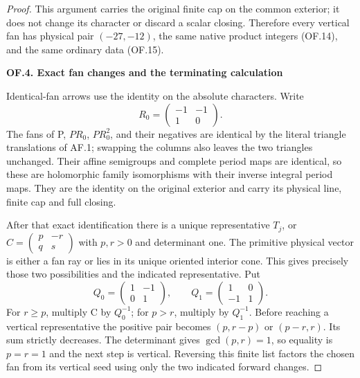 \begin{proof}
This argument carries the original finite cap on the
common exterior; it does not change its character or
discard a scalar closing. Therefore every vertical fan
has physical pair \((-27,-12)\), the same native product
integers (OF.14), and the same ordinary data (OF.15).

\par

\medskip\noindent\textbf{OF.4. Exact fan changes and the terminating calculation}

\par\nobreak

Identical-fan arrows use the identity on the absolute
characters. Write
\[
 R_0=\begin{pmatrix}-1&-1\\1&0\end{pmatrix}.
\]
The fans of P, \(PR_0\), \(PR_0^2\), and their negatives
are identical by the literal triangle translations of
AF.1; swapping the columns also leaves the two triangles
unchanged. Their affine semigroups and complete period
maps are identical, so these are holomorphic family
isomorphisms with their inverse integral period maps.
They are the identity on the original exterior and
carry its physical line, finite cap and full closing.

After that exact identification there is a unique
representative \(T_j\), or
\(C=\left(\begin{smallmatrix}p&-r\\q&s\end{smallmatrix}\right)\)
with \(p,r>0\) and determinant one. The primitive physical
vector is either a fan ray or lies in its unique oriented
interior cone. This gives precisely those two possibilities
and the indicated representative. Put
\[
 Q_0=\begin{pmatrix}1&-1\\0&1\end{pmatrix},\qquad
 Q_1=\begin{pmatrix}1&0\\-1&1\end{pmatrix}.
\]
For \(r\ge p\), multiply C by \(Q_0^{-1}\); for \(p>r\),
multiply by \(Q_1^{-1}\). Before reaching a vertical
representative the positive pair becomes \((p,r-p)\)
or \((p-r,r)\). Its sum strictly decreases. The determinant
gives \(\gcd(p,r)=1\), so equality is \(p=r=1\) and
the next step is vertical. Reversing this finite list
factors the chosen fan from its vertical seed using
only the two indicated forward changes.


\end{proof}
